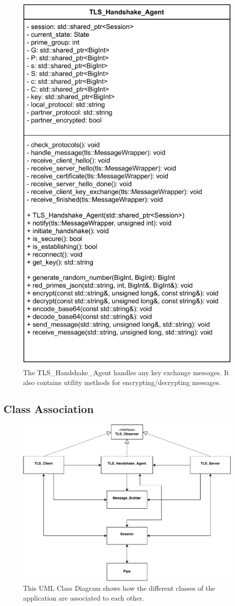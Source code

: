\documentclass[12pt, letterpaper]{article}
\begin{document}
\begin{figure}[H]
	\centering
	\includegraphics[width=.7\textwidth]{UML/HandshakeAgent}
	\caption{The TLS\_Handshake\_Agent handles any key exchange messages. It also contains  utility methods for encrypting/decrypting messages.}
	\label{fig:HandshakeAgent}
\end{figure}

\subsection{Class Association}

\begin{figure}[H]
	\centering
	\includegraphics[width=.7\textwidth]{UML/ClassInteraction}
	\caption{This UML Class Diagram shows how the different classes of the application are associated to each other.}
	\label{fig:ClassInteraction}
\end{figure}
\end{document}
